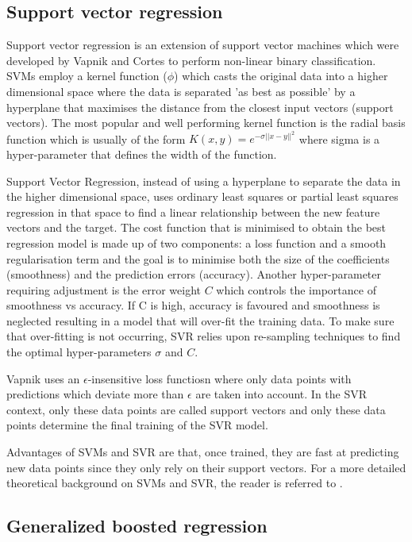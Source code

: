 \subsection*{Support vector regression}

Support vector regression is an extension of support vector machines which were developed by Vapnik and Cortes \cite{cortes_support-vector_1995} to perform non-linear binary classification. SVMs employ a kernel function ($\phi$) which casts the original data into a higher dimensional space where the data is separated 'as best as possible' by a hyperplane that maximises the distance from the closest input vectors (support vectors). The most popular and well performing kernel function is the radial basis function which is usually of the form $K(x,y) = e^{-\sigma||x-y||^2}$ where sigma is a hyper-parameter that defines the width of the function.

Support Vector Regression, instead of using a hyperplane to separate the data in the higher dimensional space, uses ordinary least squares or partial least squares regression in that space to find a linear relationship between the new feature vectors and the target. The cost function that is minimised to obtain the best regression model is made up of two components: a loss function and a smooth regularisation term and the goal is to minimise both the size of the coefficients (smoothness) and the prediction errors (accuracy). Another hyper-parameter requiring adjustment is the error weight $C$ which controls the importance of smoothness vs accuracy. If C is high, accuracy is favoured and smoothness is neglected resulting in a model that will over-fit the training data. To make sure that over-fitting is not occurring, SVR relies upon re-sampling techniques to find the optimal hyper-parameters $\sigma$ and $C$. 

Vapnik uses an $\epsilon$-insensitive loss functiosn where only data points with predictions which deviate more than $\epsilon$ are taken into account. In the SVR context, only these data points are called support vectors and only these data points determine the final training of the SVR model.

Advantages of SVMs and SVR are that, once trained, they are fast at predicting new data points since they only rely on their support vectors. For a more detailed theoretical background on SVMs and SVR, the reader is referred to \cite{cristianini_introduction_2000}. 

\subsection*{Generalized boosted regression}

